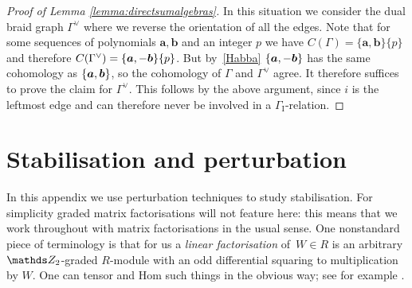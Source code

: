 \documentclass{compositio}
\theoremstyle{definition}
\numberwithin{equation}{section}
\begin{document}
\begin{proof}[Proof of Lemma \ref{lemma:directsumalgebras}]
In this situation we consider the dual braid graph $\Gamma^{\lor}$ where we reverse the orientation of all the edges. Note that for some sequences of polynomials $\boldsymbol{a},\boldsymbol{b}$ and an integer $p$ we have $C(\Gamma) = \{ \boldsymbol{a}, \boldsymbol{b} \}\{p\}$ and therefore $C(\Gamma^{\lor}) = \{ \boldsymbol{a}, - \boldsymbol{b} \}\{p\}$. But by~\eqref{Habba} $\{ \boldsymbol{a}, -\boldsymbol{b} \}$ has the same cohomology as $\{ \boldsymbol{a}, \boldsymbol{b} \}$, so the cohomology of $\Gamma$ and $\Gamma^{\lor}$ agree. It therefore suffices to prove the claim for $\Gamma^{\lor}$. This follows by the above argument, since $i$ is the leftmost edge and can therefore never be involved in a $\Gamma_{\text{I}}$-relation.
\end{proof}

\section{Stabilisation and perturbation}\label{section:morphismpert}

In this appendix we use perturbation techniques to study stabilisation. For simplicity graded matrix factorisations will not feature here: this means that we work throughout with matrix factorisations in the usual sense. One nonstandard piece of terminology is that for us a \emph{linear factorisation} of~$W \in R$ is an arbitrary $\Ztwo$-graded $R$-module with an odd differential squaring to multiplication by $W$. One can tensor and Hom such things in the obvious way; see for example \cite[Section 2]{dm1102.2957}.
\end{document}
